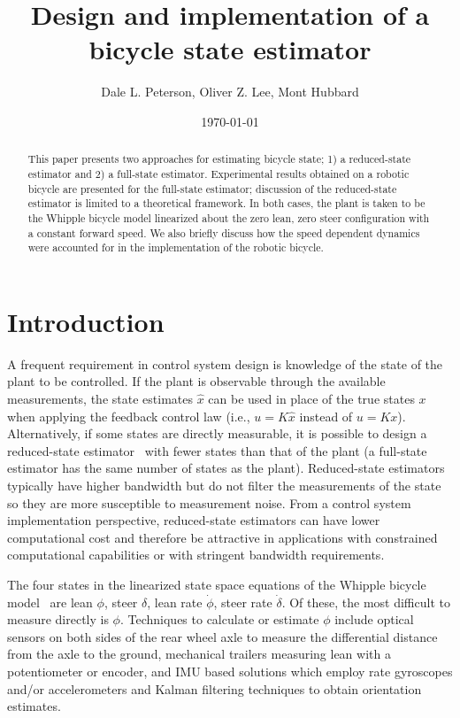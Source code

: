 \documentclass[letterpaper,11pt]{article}
\begin{document}
\title{Design and implementation of a bicycle state estimator}
\author{Dale L. Peterson, Oliver Z. Lee, Mont Hubbard}
\date{\today}
\maketitle

\begin{abstract}
This paper presents two approaches for estimating bicycle state; 1) a
reduced-state estimator and 2) a full-state estimator. Experimental results
obtained on a robotic bicycle are presented for the full-state estimator;
discussion of the reduced-state estimator is limited to a theoretical
framework. In both cases, the plant is taken to be the Whipple bicycle model
linearized about the zero lean, zero steer configuration with a constant
forward speed.  We also briefly discuss how the speed dependent dynamics were
accounted for in the implementation of the robotic bicycle.
\end{abstract}

\section{Introduction} \label{sec:introduction}
A frequent requirement in control system design is knowledge of the state of
the plant to be controlled. If the plant is observable through the available
measurements, the state estimates $\hat{x}$ can be used in place of the true
states $x$ when applying the feedback control law (i.e., $u=K\hat{x}$ instead
of $u=Kx$). Alternatively, if some states are directly measurable, it is
possible to design a reduced-state estimator~\cite{Bryson1970} with fewer
states than that of the plant (a full-state estimator has the same number of
states as the plant).  Reduced-state estimators typically have higher bandwidth
but do not filter the measurements of the state so they are more susceptible to
measurement noise.  From a control system implementation perspective,
reduced-state estimators can have lower computational cost and therefore be
attractive in applications with constrained computational capabilities or with
stringent bandwidth requirements.

The four states in the linearized state space equations of the Whipple bicycle
model~\cite{Meijaard2007} are lean $\phi$, steer $\delta$, lean rate $\dot{\phi}$, steer rate
$\dot{\delta}$.  Of these, the most difficult to measure directly is $\phi$.
Techniques to calculate or estimate $\phi$ include optical sensors on both sides
of the rear wheel axle to measure the differential distance from the axle to the ground,
mechanical trailers measuring lean with a potentiometer or encoder, and IMU
based solutions which employ rate gyroscopes and/or accelerometers and Kalman
filtering techniques to obtain orientation estimates\cite{Boniolo2008}.
\end{document}
